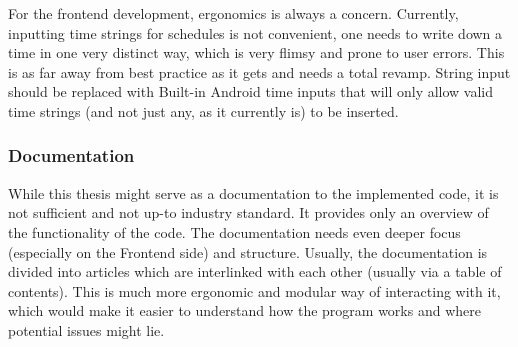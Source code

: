 For the frontend development, ergonomics is always a concern. Currently, inputting time strings for schedules is not convenient, one needs to write down a time in one very distinct way, which is very flimsy and prone to user errors. This is as far away from best practice as it gets and needs a total revamp. String input should be replaced with Built-in Android time inputs that will only allow valid time strings (and not just any, as it currently is) to be inserted.
\subsubsection{Documentation}
While this thesis might serve as a documentation to the implemented code, it is not sufficient and not up-to industry standard. It provides only an overview of the functionality of the code. The documentation needs even deeper focus (especially on the Frontend side) and structure. Usually, the documentation is divided into articles which are interlinked with each other (usually via a table of contents). This is much more ergonomic and modular way of interacting with it, which would make it easier to understand how the program works and where potential issues might lie.



%